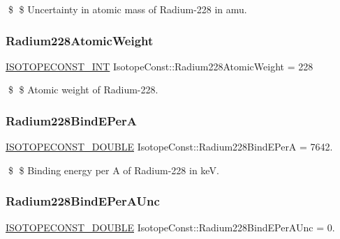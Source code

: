 \$ \$ Uncertainty in atomic mass of Radium-\/228 in amu. \mbox{\label{group___isotope_const-_radium-_ra228_ga6725733c3d4dcd85ab81d4a25a9f389b}} 
\subsubsection{\texorpdfstring{Radium228\+Atomic\+Weight}{Radium228AtomicWeight}}
{\footnotesize\ttfamily \mbox{\hyperlink{group___isotope_const-_macros_ga5f18360b3e99483a35c32d789e62621c}{I\+S\+O\+T\+O\+P\+E\+C\+O\+N\+S\+T\+\_\+\+I\+NT}} Isotope\+Const\+::\+Radium228\+Atomic\+Weight = 228}

\$ \$ Atomic weight of Radium-\/228. \mbox{\label{group___isotope_const-_radium-_ra228_gaa7e03e07dea08c08e9e32a48353f0387}} 
\subsubsection{\texorpdfstring{Radium228\+Bind\+E\+PerA}{Radium228BindEPerA}}
{\footnotesize\ttfamily \mbox{\hyperlink{group___isotope_const-_macros_ga8f45a7272ce02c0b4c65c44636ed719a}{I\+S\+O\+T\+O\+P\+E\+C\+O\+N\+S\+T\+\_\+\+D\+O\+U\+B\+LE}} Isotope\+Const\+::\+Radium228\+Bind\+E\+PerA = 7642.}

\$ \$ Binding energy per A of Radium-\/228 in keV. \mbox{\label{group___isotope_const-_radium-_ra228_gafbe73b6ecd44f2e6a8341bba317c4576}} 
\subsubsection{\texorpdfstring{Radium228\+Bind\+E\+Per\+A\+Unc}{Radium228BindEPerAUnc}}
{\footnotesize\ttfamily \mbox{\hyperlink{group___isotope_const-_macros_ga8f45a7272ce02c0b4c65c44636ed719a}{I\+S\+O\+T\+O\+P\+E\+C\+O\+N\+S\+T\+\_\+\+D\+O\+U\+B\+LE}} Isotope\+Const\+::\+Radium228\+Bind\+E\+Per\+A\+Unc = 0.}

